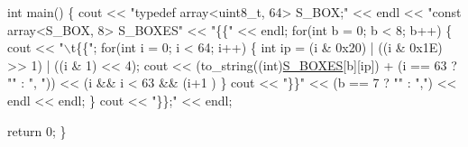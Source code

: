 \begin{DoxyCode}
\textcolor{keywordtype}{int} main()
\{
    cout << \textcolor{stringliteral}{"typedef array<uint8\_t, 64> S\_BOX;"} << endl <<
            \textcolor{stringliteral}{"const array<S\_BOX, 8> S\_BOXES"} << \textcolor{stringliteral}{"\{\{"} << endl;
    \textcolor{keywordflow}{for}(\textcolor{keywordtype}{int} b = 0; b < 8; b++)
    \{
        cout << \textcolor{stringliteral}{"\(\backslash\)t\{\{"};
        \textcolor{keywordflow}{for}(\textcolor{keywordtype}{int} i = 0; i < 64; i++)
        \{
            \textcolor{keywordtype}{int} ip = (i & 0x20) | ((i & 0x1E) >> 1) | ((i & 1) << 4);
            cout << (to\_string((\textcolor{keywordtype}{int})\hyperlink{namespacedes64_1_1__internal_ab6b95bc050b8e9ce0fe63190e204b022}{S\_BOXES}[b][ip]) + (i == 63 ? \textcolor{stringliteral}{""} : \textcolor{stringliteral}{", "})) << (i && i < 63 && (i+1
      ) %
        \}
        cout << \textcolor{stringliteral}{"\}\}"} << (b == 7 ? \textcolor{stringliteral}{""} : \textcolor{stringliteral}{","}) << endl << endl;
    \}
    cout << \textcolor{stringliteral}{"\}\};"} << endl;

    \textcolor{keywordflow}{return} 0;
\}
\end{DoxyCode}
 